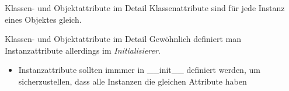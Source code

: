 \begin{frame}[fragile]{Klassen- und Objektattribute im Detail}
	Klassenattribute sind für jede Instanz eines Objektes gleich.
	
\end{frame}

\begin{frame}[fragile]{Klassen- und Objektattribute im Detail}
	Gewöhnlich definiert man Instanzattribute allerdings im \textit{Initialisierer}.
	
	\begin{itemize}
		\item Instanzattribute sollten immmer in \_\_init\_\_ definiert werden, um sicherzustellen, dass alle Instanzen die gleichen Attribute haben
	\end{itemize}
\end{frame}



